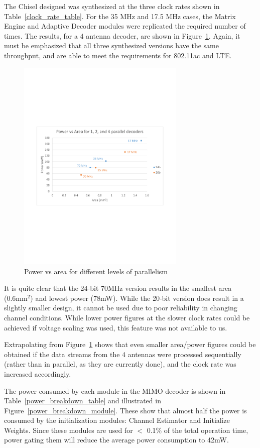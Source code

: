 \documentclass[journal]{IEEEtran}
\begin{document}
The Chisel designed was synthesized at the three clock rates shown in Table~\ref{clock_rate_table}. For the 35 MHz and 17.5 MHz cases, the Matrix Engine and Adaptive Decoder modules were replicated the required number of times. The results, for a 4 antenna decoder, are shown in Figure~\ref{power_vs_area}. Again, it must be emphasized that all three synthesized versions have the same throughput, and are able to meet the requirements for 802.11ac and LTE.

\begin{figure}[!h]
\centering
\includegraphics*[width=8cm, viewport = 60 250 560 540]{images/power_vs_area.pdf}
\caption{Power vs area for different levels of parallelism}
\label{power_vs_area}
\end{figure}

It is quite clear that the 24-bit 70MHz version results in the smallest area (0.6mm$^2$) and lowest power (78mW). While the 20-bit version does result in a slightly smaller design, it cannot be used due to poor reliability in changing channel conditions. While lower power figures at the slower clock rates could be achieved if voltage scaling was used, this feature was not available to us.

Extrapolating from Figure~\ref{power_vs_area} shows that even smaller area/power figures could be obtained if the data streams from the 4 antennas were processed sequentially (rather than in parallel, as they are currently done), and the clock rate was increased accordingly.

The power consumed by each module in the MIMO decoder is shown in Table~\ref{power_breakdown_table} and illustrated in Figure~\ref{power_breakdown_module}. These show that almost half the power is consumed by the initialization modules: Channel Estimator and Initialize Weights. Since these modules are used for $<$ 0.1\% of the total operation time, power gating them will reduce the average power consumption to 42mW.
\end{document}
